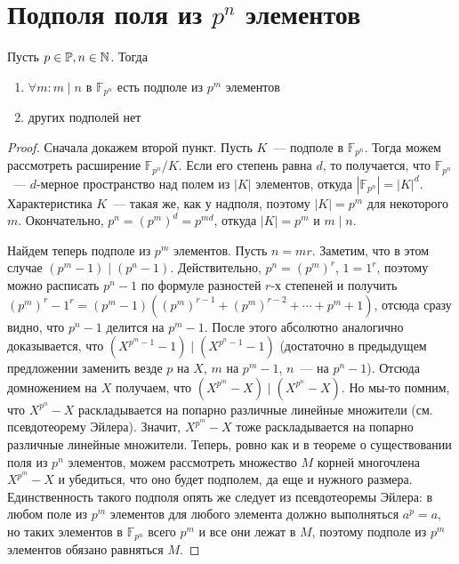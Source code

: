 \section{Подполя поля из $p^n$ элементов}
\begin{theorem-non}
    Пусть $p\in\mathbb{P}, n\in \mathbb{N}$.
    Тогда
    \begin{enumerate}
        \item $\forall m: m\mid n$ в $\mathbb{F}_{p^n}$ есть подполе из $p^m$ элементов
        \item других подполей нет
    \end{enumerate}
\end{theorem-non}
\begin{proof}
    Сначала докажем второй пункт.
    Пусть $K$~--- подполе в $\mathbb{F}_{p^n}$.
    Тогда можем рассмотреть расширение $\mathbb{F}_{p^n} / K$.
    Если его степень равна $d$, то получается, что $\mathbb{F}_{p^n}$~--- $d$-мерное пространство над полем из $|K|$ элементов, откуда $|\mathbb{F}_{p^n}| = |K|^d$.
    Характеристика $K$~--- такая же, как у надполя, поэтому $|K|=p^m$ для некоторого $m$.
    Окончательно, $p^n = (p^m)^d = p^{md}$, откуда $|K| = p^m$ и $m \mid n$.\medskip

    Найдем теперь подполе из $p^m$ элементов.
    Пусть $n=mr$.
    Заметим, что в этом случае $(p^m-1) \mid (p^n-1)$.
    Действительно, $p^n = (p^m)^r$, $1=1^r$, поэтому можно расписать $p^n-1$ по формуле разностей $r$-х степеней и получить $(p^m)^r - 1^r = (p^m-1)((p^m)^{r-1} + (p^m)^{r-2}+\cdots + p^m + 1)$, отсюда сразу видно, что $p^n-1$ делится на $p^m-1$.
    После этого абсолютно аналогично доказывается, что $(X^{p^m-1}-1) \mid (X^{p^n-1}-1)$ (достаточно в предыдущем предложении заменить везде $p$ на $X$, $m$ на $p^m-1$, $n$~--- на $p^n-1$).
    Отсюда домножением на $X$ получаем, что $(X^{p^m}-X) \mid (X^{p^n}-X)$.
    Но мы-то помним, что $X^{p^n}-X$ раскладывается на попарно различные линейные множители (см. псевдотеорему Эйлера).
    Значит, $X^{p^m}-X$ тоже раскладывается на попарно различные линейные множители.
    Теперь, ровно как и в теореме о существовании поля из $p^n$ элементов, можем рассмотреть множество $M$ корней многочлена $X^{p^m}-X$ и убедиться, что оно будет подполем, да еще и нужного размера.
    Единственность такого подполя опять же следует из псевдотеоремы Эйлера: в любом поле из $p^m$ элементов для любого элемента должно выполняться $a^p=a$, но таких элементов в $\mathbb{F}_{p^n}$ всего $p^m$ и все они лежат в $M$, поэтому подполе из $p^m$ элементов обязано равняться $M$.
\end{proof}
